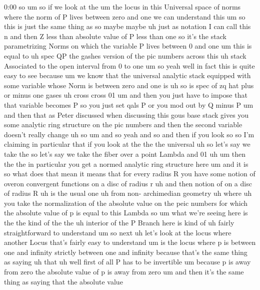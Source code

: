 \begin{unfinished}{0:00}
so
um  so  if  we  look  at  the  um  the  locus  in
this  Universal  space  of  norms  where  the
norm  of  P  lives  between  zero  and  one  we
can  understand  this
um  so  this  is  just  the  same  thing  as  so
maybe  maybe  uh  just  as  notation  I  can
call  this  n  and  then  Z  less  than
absolute  value  of  P  less  than  one  so
it's  the  stack  parametrizing  Norms  on
which  the  variable  P  lives  between  0  and
one  um  this  is  equal  to  uh
spec  QP  the  gashes  version  of  the  pic
numbers  across
this  uh  stack  Associated  to  the  open
interval  from  0  to
one
um
so
yeah  well  in  fact  this  is  quite  easy  to
see  because  um  we  know  that  the
universal  analytic  stack  equipped  with
some  variable  whose  Norm  is  between  zero
and  one  is  uh  so  is  spec  of  zq  hat  plus
or  minus  one  gases  uh  cross  cross
01  um  and  then  you  just  have  to  impose
that  that  variable  becomes  P  so  you  just
set  qals  P  or  you  mod  out  by  Q  minus  P
um  and  then  that  as  Peter  discussed  when
discussing  this  gous  base  stack  gives
you  some  analytic  ring  structure  on  the
pic  numbers  and  then  the  second  variable
doesn't  really
change  uh
so
um
and  so  yeah  and  so  and  then  if  you  look
so  so  I'm  claiming  in  particular  that  if
you  look  at  the  the  the
universal  uh  so  let's  say  we  take  the  so
let's  say  we  take  the  fiber  over  a  point
Lambda  and
01
uh
um  then  the  the  in  particular  you  get  a
normed  analytic  ring  structure
here  um  and  it
is  so  what  does  that  mean  it  means  that
for  every  radius  R  you  have  some  notion
of  overon  convergent  functions  on  a  disc
of  radius  r
uh  and
then  notion
of  on  a  disc  of  radius
R  uh  is  the  usual
one  uh  from  non-  archimedian
geometry  uh
where  uh  you  take  the  normalization  of
the  absolute  value  on  the  peic  numbers
for  which  the  absolute  value  of  p  is
equal  to  this
Lambda
so  um  what  we're  seeing  here  is  the  the
kind  of  the  the  uh  interior  of  the  P
Branch  here  is  kind  of  uh  fairly
straightforward  to
understand
um
so  next  uh  let's  look  at  the  locus  where
another  Locus  that's  fairly  easy  to
understand  um  is  the  locus
where  p  is  between  one  and
infinity  strictly  between  one  and
infinity  because  that's  the  same  thing
as  saying  uh  that  uh  well  first  of  all  P
has  to  be
invertible  um  because  p  is  away  from
zero  the  absolute  value  of  p  is  away
from  zero  um  and  then  it's  the  same
thing  as  saying  that  the  absolute  value

\end{unfinished}
